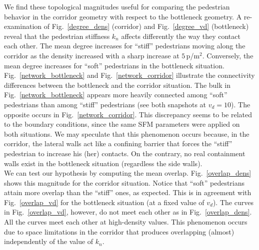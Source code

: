 \documentclass[preprint,12pt]{elsarticle}
\begin{document}
We find these topological magnitudes useful for comparing the 
pedestrian behavior in the 
corridor geometry with respect to the bottleneck geometry. A re-examination of 
Fig.~\ref{degree_dens} (corridor) and Fig.~\ref{degree_vd} (bottleneck) reveal 
that the pedestrian stiffness $k_n$ affects differently the way they contact 
each other. The mean degree increases for ``stiff'' pedestrians moving along 
the corridor as the density increased with a sharp increase at
 $5\,$p/m$^2$. Conversely, the mean degree 
increases for ``soft'' pedestrians in the bottleneck situation.\\  

Fig.~\ref{network_bottleneck} and 
Fig.~\ref{network_corridor} illustrate the connectivity differences between 
the bottleneck and the corridor situation. The bulk in 
Fig.~\ref{network_bottleneck} appears more heavily connected among ``soft'' 
pedestrians than among ``stiff'' pedestrians (see both snapshots at $v_d=10$). 
The opposite occurs in Fig.~\ref{network_corridor}. This discrepancy seems to 
be related to the boundary conditions, since the same SFM parameters were 
applied on both situations. We may speculate that this phenomenon occurs 
because, in the corridor, the lateral walls act like a 
confining barrier that 
forces the ``stiff'' pedestrian to increase his (her) contacts. On the contrary, 
no real containment walls exist in the bottleneck situation (regardless the side 
walls). \\



We can test our hypothesis by computing the mean overlap. 
Fig.~\ref{overlap_dens} shows this magnitude for the corridor situation. Notice 
that ``soft'' pedestrians attain more overlap than the ``stiff'' 
ones, as expected. This is in agreement with Fig.~\ref{overlap_vd} for the 
bottleneck situation (at a fixed value of $v_d$). The curves in 
Fig.~\ref{overlap_vd}, however, do not meet each other as in  
Fig.~\ref{overlap_dens}. All the curves meet each other at
high-density values. This phenomenon occurs due to space limitations
in the corridor that produces overlapping (almost) independently of 
the value of $k_n$. \\
\end{document}
